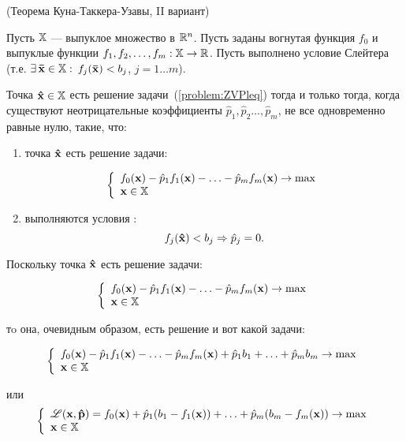\begin{teop}(Теорема Куна-Таккера-Узавы, II вариант)

Пусть $\mathbb{X}$ --- выпуклое множество в $\mathbb{R}^n$. Пусть заданы
вогнутая функция $f_0$ и выпуклые функции $f_1, f_2, \ldots, f_m:
\mathbb{X} \to \mathbb{R}$. Пусть выполнено условие Слейтера (т.е. $\exists \,
\mathbf{\bar x} \in \mathbb{X}:$ ${f_j(\mathbf{\bar x}) < b_j}$, ${j=1 \ldots
m}$).

Точка $\mathbf{\hat x}\in \mathbb{X}$ есть решение
задачи~(\ref{problem:ZVPleq}) тогда и только тогда, когда существуют
неотрицательные коэффициенты $\hat p_1, \hat p_2 \ldots, \hat p_m$,
не все одновременно равные нулю, такие, что:

\begin{enumerate}
\renewcommand{\theenumi}{(\arabic{enumi})}
\item точка $\mathbf{\hat x}$ есть решение задачи:

\[
\left\{ \begin{array}{l}
 f_0(\mathbf{x}) - \hat p_1 f_1(\mathbf{x})- \ldots - \hat p_m f_m(\mathbf{x}) \to \max  \\
 \mathbf{x} \in \mathbb{X} \\
 \end{array} \right.
\]


\item выполняются условия :
\[f_j(\mathbf{\hat x}) < b_j \Rightarrow \hat p_j =0.\]

\end{enumerate}
\end{teop}


Поскольку точка $\mathbf{\hat x}$ есть решение задачи:

\[
\left\{ \begin{array}{l}
 f_0(\mathbf{x}) - \hat p_1 f_1(\mathbf{x})- \ldots - \hat p_m f_m(\mathbf{x}) \to \max  \\
 \mathbf{x} \in \mathbb{X} \\
 \end{array} \right.
\]

\noindent тo она, очевидным образом, есть решение и вот какой
задачи:

\[
\left\{ \begin{array}{l}
 f_0(\mathbf{x}) - \hat p_1 f_1(\mathbf{x})- \ldots - \hat p_m f_m(\mathbf{x})
 + \hat p_1 b_1 + \ldots + \hat p_m b_m \to \max  \\
 \mathbf{x} \in \mathbb{X} \\
 \end{array} \right.
\]

\noindent или
\[
\left\{ \begin{array}{l}
\mathscr{L}(\mathbf{x}, \mathbf{\hat p})= f_0(\mathbf{x}) + \hat p_1 (b_1 - f_1(\mathbf{x})) + \ldots + \hat p_m (b_m - f_m(\mathbf{x})) \to \max  \\
 \mathbf{x} \in \mathbb{X} \\
 \end{array} \right.
\]


